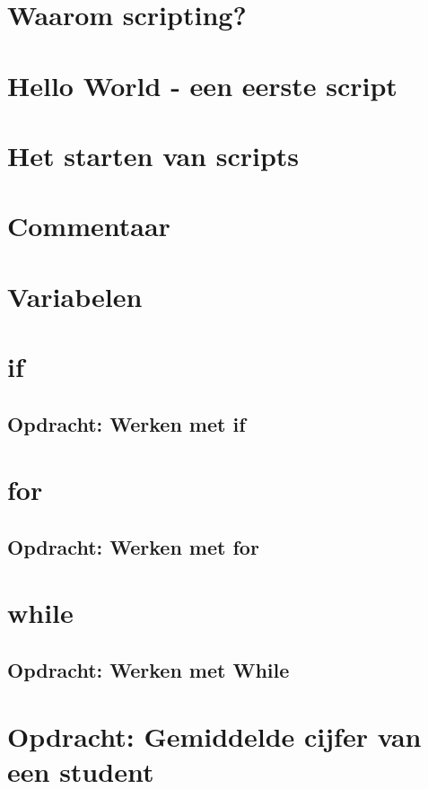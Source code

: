 \documentclass[a4paper,12pt,twoside,openright,titlepage]{book}
\begin{document}
\section{Waarom scripting?}

\section{Hello World - een eerste script}

\section{Het starten van scripts}

\section{Commentaar}

\section{Variabelen}

\section{if}

\subsection{Opdracht: Werken met if}

\section{for}

\subsection{Opdracht: Werken met for}

\section{while}

\subsection{Opdracht: Werken met While}

\section{Opdracht: Gemiddelde cijfer van een student}


\backmatter
\printindex
\end{document}
